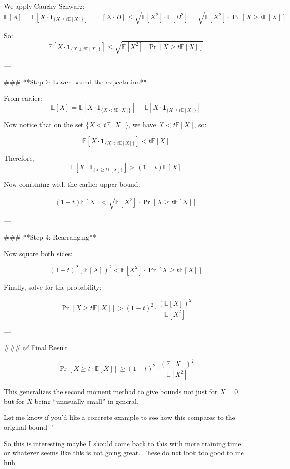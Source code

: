 \begin{enumerate}
\begin{shaded}
We apply Cauchy-Schwarz:
\[
\mathbb{E}[A] = \mathbb{E}[X \cdot \mathbf{1}_{\{X \geq t\mathbb{E}[X]\}}] = \mathbb{E}[X \cdot B] \leq \sqrt{\mathbb{E}[X^2] \cdot \mathbb{E}[B^2]} = \sqrt{\mathbb{E}[X^2] \cdot \Pr[X \geq t\mathbb{E}[X]]}
\]

So:
\[
\mathbb{E}[X \cdot \mathbf{1}_{\{X \geq t\mathbb{E}[X]\}}] \leq \sqrt{\mathbb{E}[X^2] \cdot \Pr[X \geq t\mathbb{E}[X]]}
\]

---

### **Step 3: Lower bound the expectation**

From earlier:
\[
\mathbb{E}[X] = \mathbb{E}[X \cdot \mathbf{1}_{\{X < t\mathbb{E}[X]\}}] + \mathbb{E}[X \cdot \mathbf{1}_{\{X \geq t\mathbb{E}[X]\}}]
\]

Now notice that on the set \( \{X < t\mathbb{E}[X]\} \), we have \( X < t\mathbb{E}[X] \), so:

\[
\mathbb{E}[X \cdot \mathbf{1}_{\{X < t\mathbb{E}[X]\}}] < t\mathbb{E}[X]
\]

Therefore,
\[
\mathbb{E}[X \cdot \mathbf{1}_{\{X \geq t\mathbb{E}[X]\}}] > (1 - t)\mathbb{E}[X]
\]

Now combining with the earlier upper bound:

\[
(1 - t)\mathbb{E}[X] < \sqrt{\mathbb{E}[X^2] \cdot \Pr[X \geq t\mathbb{E}[X]]}
\]

---

### **Step 4: Rearranging**

Now square both sides:

\[
(1 - t)^2 (\mathbb{E}[X])^2 < \mathbb{E}[X^2] \cdot \Pr[X \geq t\mathbb{E}[X]]
\]

Finally, solve for the probability:

\[
\Pr[X \geq t\mathbb{E}[X]] > (1 - t)^2 \cdot \frac{(\mathbb{E}[X])^2}{\mathbb{E}[X^2]}
\]

---

### ✅ Final Result

\[
\boxed{
\Pr[X \geq t\cdot \mathbb{E}[X]] \geq (1-t)^2 \cdot \frac{(\mathbb{E}[X])^2}{\mathbb{E}[X^2]}
}
\]

This generalizes the second moment method to give bounds not just for \( X = 0 \), but for \( X \) being “unusually small” in general.

Let me know if you'd like a concrete example to see how this compares to the original bound!
"

So this is interesting maybe I should come back to this with more training time or whatever seems like this is not going great. These do not look too good to me huh.


\end{shaded}
\end{enumerate}
